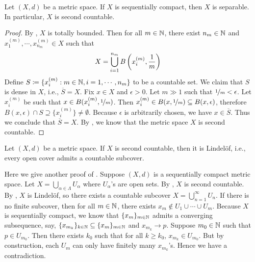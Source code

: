 \documentclass[screen]{techreport}
\numberwithin{equation}{section}
\begin{document}
\begin{proposition}\label{Prop:MetricSeqCompactImplySeparable}
	Let $(X,d)$ be a metric space.
	If $X$ is sequentially compact, then $X$ is separable.
	In particular, $X$ is second countable.
\end{proposition}
\begin{proof}
	By , $X$ is totally bounded.
	Then for all $m \in \mathbb{N}$, there exist $n_m \in \mathbb{N}$ and $x^{(m)}_1,\cdots,x^{(m)}_{n_m} \in X$ such that
	\[
	X = \bigcup_{i=1}^{n_m} B\left({ x^{(m)}_i, \frac{1}{m}}\right) 
	\]
	Define $S \coloneqq \{ x^{(m)}_i : m \in \mathbb{N}, i=1,\cdots,n_m \}$ to be a countable set.
	We claim that $S$ is dense in $X$, i.e., $\overline{S} = X$.
	Fix $x \in X$ and $\epsilon > 0$.
	Let $m \gg 1$ such that $\nicefrac{1}{m} < \epsilon$.
	Let $x^{(m)}_i$ be such that $x \in B(x^{(m)}_i, \nicefrac{1}{m})$.
	Then $x^{(m)}_i \in B(x,\nicefrac{1}{m}) \subseteq B(x,\epsilon)$, therefore $B(x,\epsilon) \cap S \supseteq \{ x^{(m)}_i \} \neq \emptyset$.
	Because $\epsilon$ is arbitrarily chosen, we have $x \in \overline{S}$.
	Thus we conclude that $\overline{S} = X$.
	By , we know that the metric space $X$ is second countable.
\end{proof}

\begin{proposition}\label{Prop:MetricSndCountImplyLindelof}
	Let $(X,d)$ be a metric space.
	If $X$ is second countable, then it is Lindel{\"o}f, i.e., every open cover admits a countable subcover.
\end{proposition}

\begin{remark}\label{Rem:AnotherProofMetricSeqCompactImplyCompact}
	Here we give another proof of .
	Suppose $(X,d)$ is a sequentially compact metric space.
	Let $X = \bigcup_{\alpha \in \Lambda} U_\alpha$ where $U_\alpha$'s are open sets.
	By , $X$ is second countable.
	By , $X$ is Lindel{\"o}f, so there exists a countable subcover $X = \bigcup_{n=1}^\infty U_n$.
	If there is no finite subcover, then for all $m \in \mathbb{N}$, there exists $x_m \not\in U_1 \cup \cdots \cup U_m$.
	Because $X$ is sequentially compact, we know that $\{x_m\}_{m \in \mathbb{N}}$ admits a converging subsequence, say, $\{x_{m_k}\}_{k \in \mathbb{N}} \subseteq \{ x_m \}_{m \in \mathbb{N}}$ and $x_{m_k} \rightarrow p$.
	Suppose $m_0 \in \mathbb{N}$ such that $p \in U_{m_0}$.
	Then there exists $k_0$ such that for all $k \ge k_0$, $x_{m_k} \in U_{m_0}$.
	But by construction, each $U_m$ can only have finitely many $x_{m_k}$'s.
	Hence we have a contradiction.
\end{remark}
\end{document}
